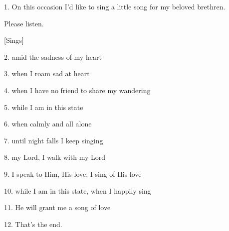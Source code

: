 \setcounter{footnote}{0}

1. On this occasion I'd like to sing a little song for my beloved brethren.


Please listen.

[Sings]

2. amid the sadness of my heart

3. when I roam sad at heart

4. when I have no friend to share my wandering

5. while I am in this state

6. when calmly and all alone

7. until night falls I keep singing

8. my Lord, I walk with my Lord

9. I speak to Him, His love, I sing of His love

10. while I am in this state, when I happily sing

11. He will grant me a song of love

12. That's the end.

